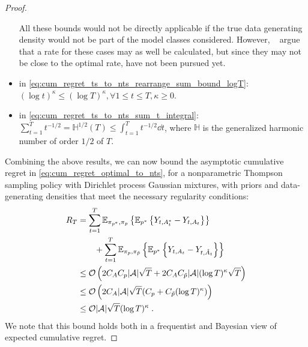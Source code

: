 \begin{proof}
\begin{itemize}
	All these bounds would not be directly applicable if the true data generating density would not be part of the model classes considered.
	However, ~\citet{j-Ghosal2001} argue that a rate for these cases may as well be calculated, but since they may not be close to the optimal rate, have not been pursued yet.

	\item in \autoref{eq:cum_regret_ts_to_nts_rearrange_sum_bound_logT}: $(\log t)^{\kappa} \leq (\log T)^{\kappa}, \forall 1 \leq t \leq T, \kappa \geq 0$.

	\item in \autoref{eq:cum_regret_ts_to_nts_sum_t_integral}: $\sum_{t=1}^{T} t^{-1/2} = \mathbb{H}^{1/2}(T)\leq \int_{t=1}^{T} t^{-1/2} \dd{t}$, where $\mathbb{H}$ is the generalized harmonic number of order $1/2$ of $T$. 
\end{itemize}

Combining the above results, we can now bound the asymptotic cumulative regret in \autoref{eq:cum_regret_optimal_to_nts}, for a nonparametric Thompson sampling policy with Dirichlet process Gaussian mixtures, with priors and data-generating densities that meet the necessary regularity conditions:
\vspace*{-1ex}
\begin{align}
R_T 
&=\sum_{t=1}^T \mathbb{E}_{\pi_{p^*},\pi_{p}}\left\{ \mathbb{E}_{p^*}\left\{  Y_{t,A^*_t}-Y_{t,A_t} \right\} \right\} \nonumber \\
& \qquad + \sum_{t=1}^T \mathbb{E}_{\pi_{p},\pi_{\tilde{p}}}\left\{ \mathbb{E}_{p^*}\left\{  Y_{t,A_t}-Y_{t,\tilde{A}_t} \right\} \right\} \\
&\leq \mathcal{O} \left(2 C_A C_p |\mathcal{A}| \sqrt{T} + 2 C_A C_{\tilde{p}} |\mathcal{A}| (\log T)^\kappa\sqrt{T} \right)\\
&\leq \mathcal{O} \left(2 C_A |\mathcal{A}| \sqrt{T} (C_p + C_{\tilde{p}} (\log T)^\kappa ) \right) \\
&\leq \mathcal{O} |\mathcal{A}| \sqrt{T} (\log T)^\kappa \;.
\end{align}
We note that this bound holds both in a frequentist and Bayesian view of expected cumulative regret.
\end{proof} 


